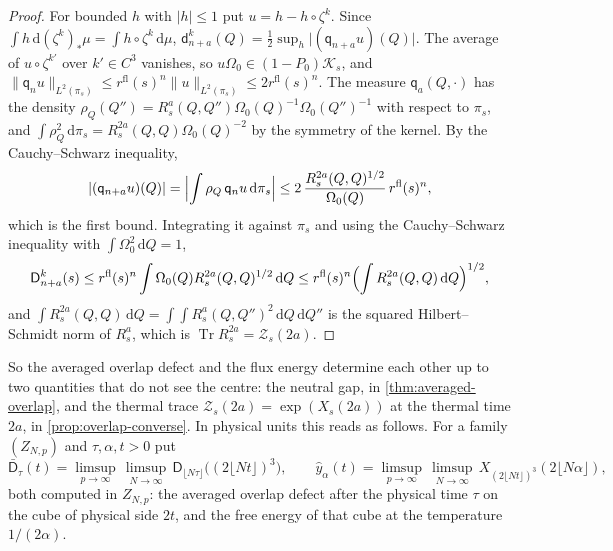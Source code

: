 \documentclass[11pt,a4paper]{amsart}
\theoremstyle{definition}
\theoremstyle{remark}
\numberwithin{equation}{section}
\DeclareMathOperator{\Tr}{Tr}        %
\newcommand{\Kspace}{\mathcal{K}}    %
\newcommand{\norm}[1]{\lVert #1\rVert}     %
\newcommand{\abs}[1]{\lvert #1\rvert}      %
\newcommand{\dd}{\,\mathrm{d}}             %
\newcommand{\TT}{\mathbb{T}}               %
\newcommand{\Zc}{\mathcal{Z}}              %
\newcommand{\Zs}[2]{\Zc_{#1}(#2)}          %
\newcommand{\XT}[2]{X_{#1}(#2)}            %
\newcommand{\cube}[1]{(2#1)^3}             %
\newcommand{\Omegazero}{\Omega_0}          %
\begin{document}
\begin{proof}
For bounded $h$ with $\abs h\le1$ put $u=h-h\circ\zeta^k$. Since $\int h\dd(\zeta^k)_*\mu=\int h\circ\zeta^k\dd\mu$, $\mathsf d^k_{n+a}(Q)=\frac12\sup_h\abs{(\mathsf q_{n+a}u)(Q)}$. The average of $u\circ\zeta^{k'}$ over $k'\in C^3$ vanishes, so $u\Omegazero\in(1-P_0)\Kspace_s$, and $\norm{\mathsf q_nu}_{L^2(\pi_s)}\le r^{\mathrm{fl}}(s)^n\norm u_{L^2(\pi_s)}\le2r^{\mathrm{fl}}(s)^n$. The measure $\mathsf q_a(Q,\cdot)$ has the density $\rho_Q(Q'')=R_s^a(Q,Q'')\Omegazero(Q)^{-1}\Omegazero(Q'')^{-1}$ with respect to $\pi_s$, and $\int\rho_Q^2\dd\pi_s=R_s^{2a}(Q,Q)\Omegazero(Q)^{-2}$ by the symmetry of the kernel. By the Cauchy--Schwarz inequality,
\[
\abs{(\mathsf q_{n+a}u)(Q)}=\Bigl\lvert\int\rho_Q\,\mathsf q_nu\dd\pi_s\Bigr\rvert\le2\,\frac{R_s^{2a}(Q,Q)^{1/2}}{\Omegazero(Q)}\,r^{\mathrm{fl}}(s)^n,
\]
which is the first bound. Integrating it against $\pi_s$ and using the Cauchy--Schwarz inequality with $\int\Omegazero^2\dd Q=1$,
\[
\mathsf D^k_{n+a}(s)\le r^{\mathrm{fl}}(s)^n\int\Omegazero(Q)R_s^{2a}(Q,Q)^{1/2}\dd Q\le r^{\mathrm{fl}}(s)^n\Bigl(\int R_s^{2a}(Q,Q)\dd Q\Bigr)^{1/2},
\]
and $\int R_s^{2a}(Q,Q)\dd Q=\int\!\!\int R_s^a(Q,Q'')^2\dd Q\dd Q''$ is the squared Hilbert--Schmidt norm of $R_s^a$, which is $\Tr R_s^{2a}=\Zs{s}{2a}$.
\end{proof}

So the averaged overlap defect and the flux energy determine each other up to two quantities that do not see the centre: the neutral gap, in \cref{thm:averaged-overlap}, and the thermal trace $\Zs{s}{2a}=\exp(\XT{s}{2a})$ at the thermal time $2a$, in \cref{prop:overlap-converse}. In physical units this reads as follows. For a family $(Z_{N,p})$ and $\tau,\alpha,t>0$ put
\[
\bar{\mathsf D}_\tau(t)=\limsup_{p\to\infty}\,\limsup_{N\to\infty}\,\mathsf D_{\lfloor N\tau\rfloor}\bigl(\cube{\lfloor Nt\rfloor}\bigr),\qquad \hat y_\alpha(t)=\limsup_{p\to\infty}\,\limsup_{N\to\infty}\,\XT{\cube{\lfloor Nt\rfloor}}{2\lfloor N\alpha\rfloor},
\]
both computed in $Z_{N,p}$: the averaged overlap defect after the physical time $\tau$ on the cube of physical side $2t$, and the free energy of that cube at the temperature $1/(2\alpha)$.
\end{document}
